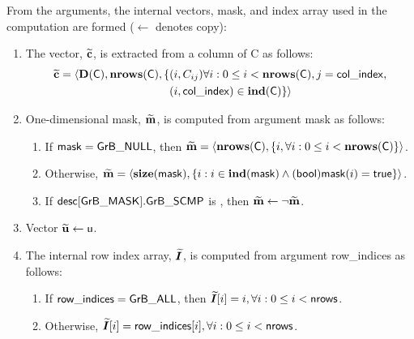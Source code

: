 From the arguments, the internal vectors, mask, and index array used in 
the computation are formed ($\leftarrow$ denotes copy):
\begin{enumerate}
	\item The vector, ${\bf \widetilde{c}}$, is extracted from a column of {\sf C}
    as follows:
    \[
    \begin{aligned}
        {\bf \widetilde{c}} = \langle  \bold{D}({\sf C}), \bold{nrows}({\sf C}), 
        \{ & (i, C_{ij}) \forall i : 0 \leq i < \bold{nrows}({\sf C}),
        j = {\sf col\_index}, \\
        & (i, {\sf col\_index}) \in \bold{ind}({\sf C})\} \rangle
    \end{aligned}
    \]

	\item One-dimensional mask, ${\bf \widetilde{m}}$, is computed from 
    argument {\sf mask} as follows:
	\begin{enumerate}
		\item	If ${\sf mask} = {\sf GrB\_NULL}$, then ${\bf \widetilde{m}} = 
        \langle \bold{nrows}({\sf C}), \{i, \forall i : 0 \leq i < 
        \bold{nrows}({\sf C}) \} \rangle$.

		\item	Otherwise, ${\bf \widetilde{m}} = 
        \langle \bold{size}({\sf mask}), \{i :  i \in \bold{ind}({\sf mask}) \wedge
        ({\sf bool}){\sf mask}(i) = {\sf true} \} \rangle$.

		\item	If ${\sf desc[GrB\_MASK].GrB\_SCMP}$ is \true, then 
        ${\bf \widetilde{m}} \leftarrow \neg {\bf \widetilde{m}}$.
	\end{enumerate}

	\item Vector ${\bf \widetilde{u}} \leftarrow {\sf u}$.
    
    \item The internal row index array, $\bm{\widetilde{I}}$, is computed from 
    argument {\sf row\_indices} as follows:
	\begin{enumerate}
		\item	If ${\sf row\_indices} = {\sf GrB\_ALL}$, then 
        $\bm{\widetilde{I}}[i] = i, \forall i : 0 \leq i < {\sf nrows}$.

		\item	Otherwise, $\bm{\widetilde{I}}[i] = {\sf row\_indices}[i], 
        \forall i : 0 \leq i < {\sf nrows}$.
    \end{enumerate}
\end{enumerate}

